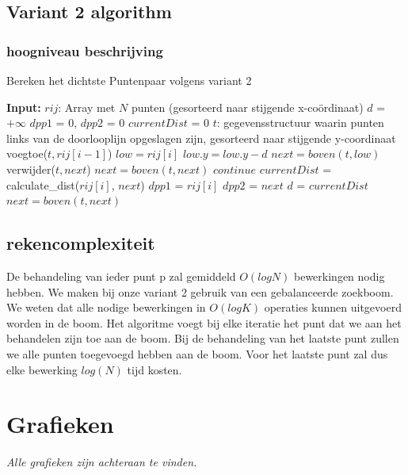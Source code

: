 \documentclass[12pt]{article}
\begin{document}
\subsection{Variant 2 algorithm}
\subsubsection{hoogniveau beschrijving}

\begin{algorithm}
\caption{Bereken het dichtste Puntenpaar volgens variant 2}
\begin{algorithmic}
	\STATE \textbf{Input:}  $rij$: Array met $N$ punten (gesorteerd naar stijgende x-co\"ordinaat)
	\STATE $d$ = $+\infty$
	\STATE $dpp1$ = 0, $dpp2$ = 0
	\STATE $currentDist$ = 0
	\STATE $t$: gegevensstructuur waarin punten links van de doorlooplijn opgeslagen zijn, gesorteerd naar stijgende y-coordinaat
    \STATE voegtoe($t, rij[i-1]$)
    \STATE $low = rij[i]$
    \STATE $low.y = low.y - d$
    \STATE $next = boven(t,low)$
        \STATE verwijder($t, next$)
        \STATE $next = boven(t,next)$
        \STATE $continue$
      \ENDIF
      \STATE $currentDist$ = calculate\_dist($rij[i]$, $next$)
  			\STATE $dpp1$ = $rij[i]$
  			\STATE $dpp2$ = $next$
  			\STATE $d$ = $currentDist$
  		\ENDIF
      \STATE $next = boven(t,next)$
    \ENDWHILE
  \ENDFOR
\end{algorithmic}
\end{algorithm}

\subsection{rekencomplexiteit}
De behandeling van ieder punt p zal gemiddeld $O(logN)$ bewerkingen nodig hebben.
We maken bij onze variant 2 gebruik van een gebalanceerde zoekboom.
We weten dat alle nodige bewerkingen in $O(logK)$ operaties kunnen uitgevoerd worden in de boom.
Het algoritme voegt bij elke iteratie het punt dat we aan het behandelen zijn toe aan de boom.
Bij de behandeling van het laatste punt zullen we alle punten toegevoegd hebben aan de boom.
Voor het laatste punt zal dus elke bewerking $log(N)$ tijd kosten.

\section{Grafieken}
\textit{Alle grafieken zijn achteraan te vinden.}
\end{document}

